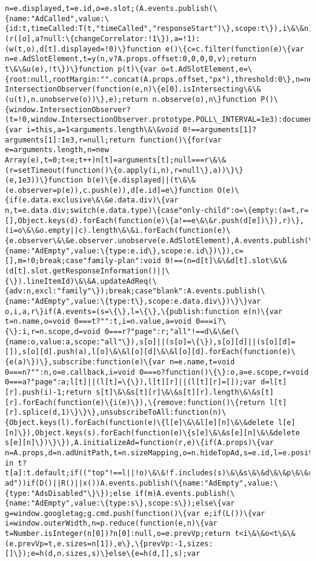 \documentclass[11pt]{article}
\begin{document}
\begin{Verbatim}[commandchars=\\\{\}]
n=e.displayed,t=e.id,o=e.slot;(A.events.publish(\{name:"AdCalled",value:\{id:t,timeCalled:T(t,"timeCalled","responseStart")\},scope:t\}),i\&\&n)?(r([o],a?null:\{changeCorrelator:!1\}),a=!1):(w(t,o),d[t].displayed=!0)\}function e()\{c=c.filter(function(e)\{var n=e.AdSlotElement,t=y(n,v?A.props.offset:0,0,0,0,v);return t\&\&u(e),!t\})\}function p(t)\{var o=t.AdSlotElement,e=\{root:null,rootMargin:"".concat(A.props.offset,"px"),threshold:0\},n=new IntersectionObserver(function(e,n)\{e[0].isIntersecting\&\&(u(t),n.unobserve(o))\},e);return n.observe(o),n\}function P()\{window.IntersectionObserver?(t=!0,window.IntersectionObserver.prototype.POLL\_INTERVAL=1e3):document.addEventListener("scroll",function(o)\{var i=this,a=1<arguments.length\&\&void 0!==arguments[1]?arguments[1]:1e3,r=null;return function()\{for(var e=arguments.length,n=new Array(e),t=0;t<e;t++)n[t]=arguments[t];null===r\&\&(r=setTimeout(function()\{o.apply(i,n),r=null\},a))\}\}(e,1e3))\}function b(e)\{e.displayed||(t\&\&(e.observer=p(e)),c.push(e)),d[e.id]=e\}function O(e)\{if(e.data.exclusive\&\&e.data.div)\{var n,t=e.data.div;switch(e.data.type)\{case"only-child":o=\{empty:(a=t,r=[],Object.keys(d).forEach(function(e)\{a!==e\&\&r.push(d[e])\}),r)\},(i=o\&\&o.empty||c).length\&\&i.forEach(function(e)\{e.observer\&\&e.observer.unobserve(e.AdSlotElement),A.events.publish(\{name:"AdEmpty",value:\{type:e.id\},scope:e.id\})\}),c=[],m=!0;break;case"family-plan":void 0!==(n=d[t]\&\&d[t].slot\&\&(d[t].slot.getResponseInformation()||\{\}).lineItemId)\&\&A.updateAdReq(\{adv:n,excl:"family"\});break;case"blank":A.events.publish(\{name:"AdEmpty",value:\{type:t\},scope:e.data.div\})\}\}var o,i,a,r\}if(A.events=(s=\{\},l=\{\},\{publish:function e(n)\{var t=n.name,o=void 0===t?"":t,i=n.value,a=void 0===i?\{\}:i,r=n.scope,d=void 0===r?"page":r;"all"!==d\&\&e(\{name:o,value:a,scope:"all"\}),s[o]||(s[o]=\{\}),s[o][d]||(s[o][d]=[]),s[o][d].push(a),l[o]\&\&l[o][d]\&\&l[o][d].forEach(function(e)\{e(a)\})\},subscribe:function(e)\{var n=e.name,t=void 0===n?"":n,o=e.callback,i=void 0===o?function()\{\}:o,a=e.scope,r=void 0===a?"page":a;l[t]||(l[t]=\{\}),l[t][r]||(l[t][r]=[]);var d=l[t][r].push(i)-1;return s[t]\&\&s[t][r]\&\&s[t][r].length\&\&s[t][r].forEach(function(e)\{i(e)\}),\{remove:function()\{return l[t][r].splice(d,1)\}\}\},unsubscribeToAll:function(n)\{Object.keys(l).forEach(function(e)\{l[e]\&\&l[e][n]\&\&delete l[e][n]\}),Object.keys(s).forEach(function(e)\{s[e]\&\&s[e][n]\&\&delete s[e][n]\})\}\}),A.initializeAd=function(r,e)\{if(A.props)\{var n=A.props,d=n.adUnitPath,t=n.sizeMapping,o=n.hideTopAd,s=e.id,l=e.position,i=e.sizeKey,c=e.lazyLoad,u=e.truePosition,a=i||l,p=a in t?t[a]:t.default;if(("top"!==l||!o)\&\&!f.includes(s)\&\&s\&\&d\&\&p\&\&r\&\&r.classList\&\&!r.classList.contains("placed-ad"))if(D()||R()||x())A.events.publish(\{name:"AdEmpty",value:\{type:"AdsDisabled"\}\});else if(m)A.events.publish(\{name:"AdEmpty",value:\{type:s\},scope:s\});else\{var g=window.googletag;g.cmd.push(function()\{var e;if(L())\{var i=window.outerWidth,n=p.reduce(function(e,n)\{var t=Number.isInteger(n[0])?n[0]:null,o=e.prevVp;return t<i\&\&o<t\&\&(e.prevVp=t,e.sizes=n[1]),e\},\{prevVp:-1,sizes:[]\});e=h(d,n.sizes,s)\}else\{e=h(d,[],s);var 
\end{Verbatim}
\end{document}
